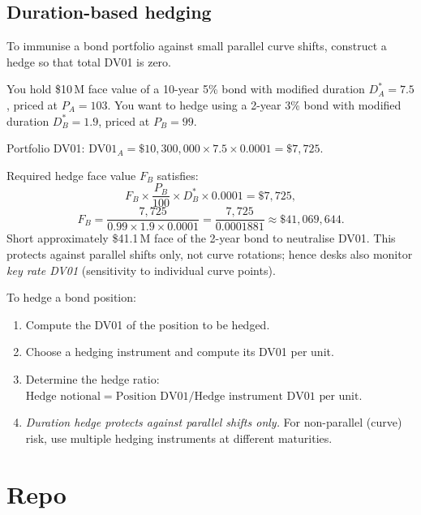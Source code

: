 \subsection{Duration-based hedging}
\label{sec:fi_duration_hedge}

To immunise a bond portfolio against small parallel curve shifts,
construct a hedge so that total DV01 is zero.

\begin{example}
\label{ex:duration_hedge}
You hold \$10\,M face value of a 10-year 5\% bond with modified
duration $D^*_A = 7.5$, priced at $P_A = 103$.  You want to hedge
using a 2-year 3\% bond with modified duration $D^*_B = 1.9$,
priced at $P_B = 99$.

Portfolio DV01:
$\text{DV01}_A = \$10{,}300{,}000 \times 7.5 \times 0.0001
= \$7{,}725$.

Required hedge face value $F_B$ satisfies:
\[
  F_B \times \frac{P_B}{100} \times D^*_B \times 0.0001
  = \$7{,}725,
\]
\[
  F_B = \frac{7{,}725}{0.99 \times 1.9 \times 0.0001}
  = \frac{7{,}725}{0.0001881}
  \approx \$41{,}069{,}644.
\]
Short approximately \$41.1\,M face of the 2-year bond to neutralise
DV01.  This protects against parallel shifts only, not curve
rotations; hence desks also monitor \emph{key rate DV01} (sensitivity
to individual curve points).
\end{example}

\begin{keyfactbox}
To hedge a bond position:
\begin{enumerate}
  \item Compute the DV01 of the position to be hedged.
  \item Choose a hedging instrument and compute its DV01 per unit.
  \item Determine the hedge ratio: $\text{Hedge notional} =
    \text{Position DV01} / \text{Hedge instrument DV01 per unit}$.
  \item \emph{Duration hedge protects against parallel shifts only.}
    For non-parallel (curve) risk, use multiple hedging instruments
    at different maturities.
\end{enumerate}
\end{keyfactbox}


\section{Repo}
\label{sec:fi_repo}

